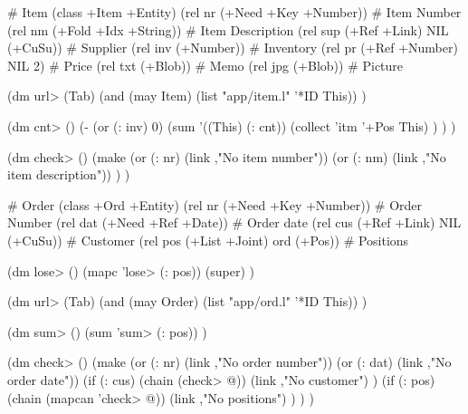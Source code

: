 \begin{wideverbatim}

# Item
(class +Item +Entity)
(rel nr (+Need +Key +Number))          # Item Number
(rel nm (+Fold +Idx +String))          # Item Description
(rel sup (+Ref +Link) NIL (+CuSu))     # Supplier
(rel inv (+Number))                    # Inventory
(rel pr (+Ref +Number) NIL 2)          # Price
(rel txt (+Blob))                      # Memo
(rel jpg (+Blob))                      # Picture

(dm url> (Tab)
   (and (may Item) (list "app/item.l" '*ID This)) )

(dm cnt> ()
   (-
      (or (: inv) 0)
      (sum '((This) (: cnt))
         (collect 'itm '+Pos This) ) ) )

(dm check> ()
   (make
      (or (: nr) (link ,"No item number"))
      (or (: nm) (link ,"No item description")) ) )


# Order
(class +Ord +Entity)
(rel nr (+Need +Key +Number))          # Order Number
(rel dat (+Need +Ref +Date))           # Order date
(rel cus (+Ref +Link) NIL (+CuSu))     # Customer
(rel pos (+List +Joint) ord (+Pos))    # Positions

(dm lose> ()
   (mapc 'lose> (: pos))
   (super) )

(dm url> (Tab)
   (and (may Order) (list "app/ord.l" '*ID This)) )

(dm sum> ()
   (sum 'sum> (: pos)) )

(dm check> ()
   (make
      (or (: nr) (link ,"No order number"))
      (or (: dat) (link ,"No order date"))
      (if (: cus)
         (chain (check> @))
         (link ,"No customer") )
      (if (: pos)
         (chain (mapcan 'check> @))
         (link ,"No positions") ) ) )

\end{wideverbatim}

